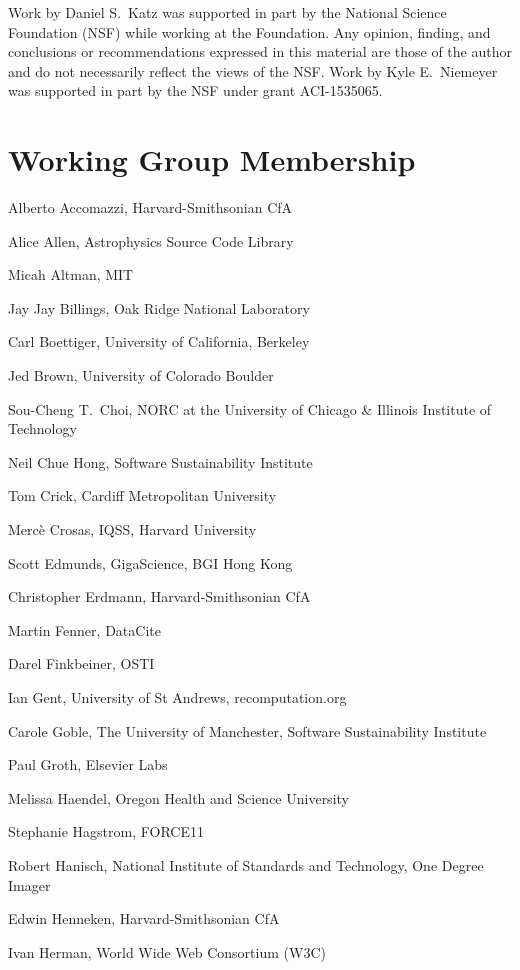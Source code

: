 \documentclass[12pt, oneside]{amsart}
\begin{document}
Work by Daniel S.~Katz was supported in part by the National Science Foundation (NSF) while working at the Foundation.
Any opinion, finding, and conclusions or recommendations expressed in this material are those of the author and do not necessarily reflect the views of the NSF.
Work by Kyle E.~Niemeyer was supported in part by the NSF under grant ACI-1535065.

\appendix

\section{Working Group Membership}
\label{app:wg_members}

Alberto Accomazzi, Harvard-Smithsonian CfA

Alice Allen, Astrophysics Source Code Library

Micah Altman, MIT

Jay Jay Billings, Oak Ridge National Laboratory

Carl Boettiger, University of California,  Berkeley

Jed Brown, University of Colorado Boulder

Sou-Cheng T.~Choi, NORC at the University of Chicago \& Illinois Institute of Technology

Neil Chue Hong, Software Sustainability Institute

Tom Crick, Cardiff Metropolitan University

Merc\`e Crosas, IQSS, Harvard University

Scott Edmunds, GigaScience, BGI Hong Kong

Christopher Erdmann, Harvard-Smithsonian CfA

Martin Fenner, DataCite

Darel Finkbeiner, OSTI

Ian Gent, University of St Andrews, recomputation.org

Carole Goble, The University of Manchester, Software Sustainability Institute

Paul Groth, Elsevier Labs

Melissa Haendel, Oregon Health and Science University

Stephanie Hagstrom, FORCE11

Robert Hanisch, National Institute of Standards and Technology, One Degree Imager

Edwin Henneken, Harvard-Smithsonian CfA

Ivan Herman, World Wide Web Consortium (W3C)
\end{document}
